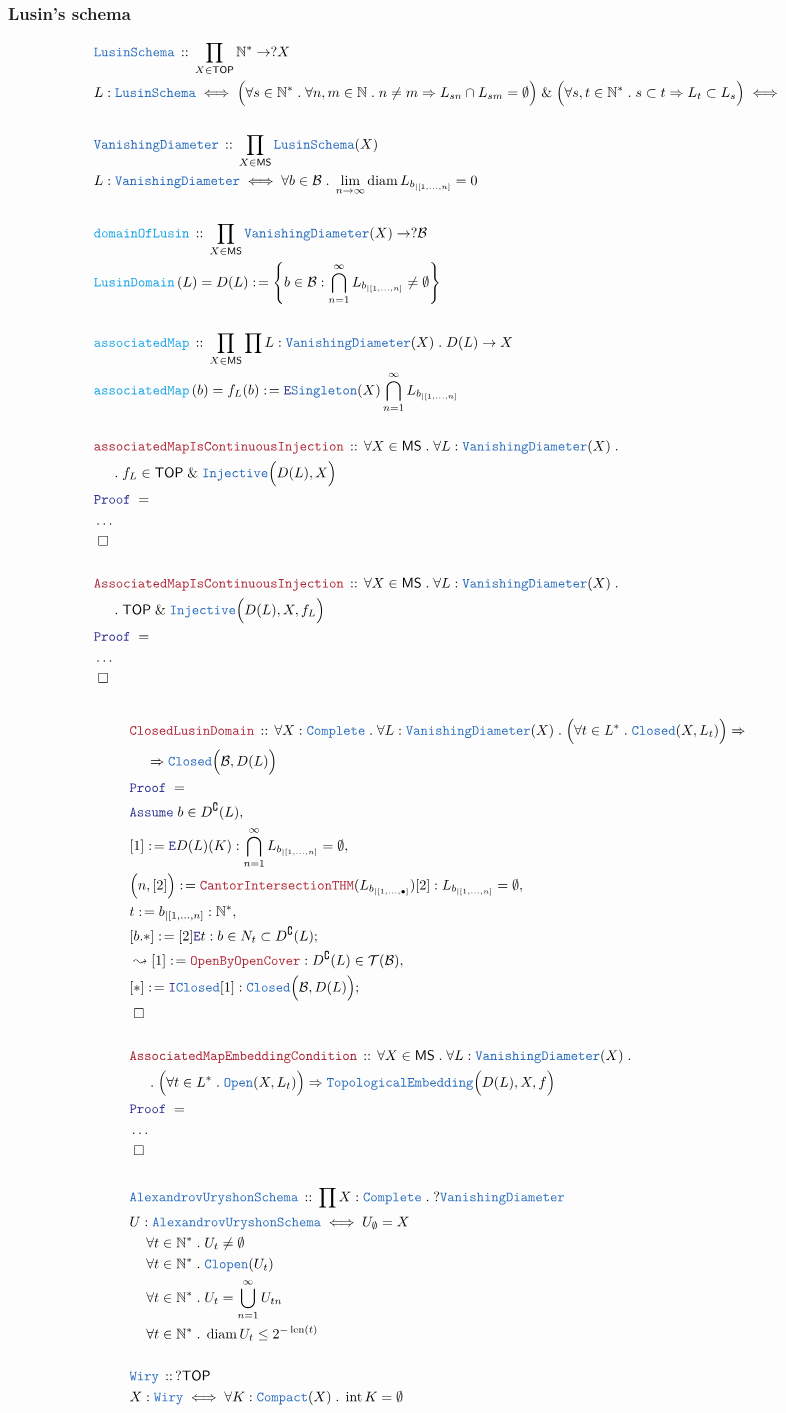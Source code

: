 \documentclass[12pt]{scrartcl}
\newcommand{\TYPE}[1]{\textcolor{NavyBlue}{\mathtt{#1}}}
\newcommand{\FUNC}[1]{\textcolor{Cerulean}{\mathtt{#1}}}
\newcommand{\LOGIC}[1]{\textcolor{Blue}{\mathtt{#1}}}
\newcommand{\THM}[1]{\textcolor{Maroon}{\mathtt{#1}}}
\renewcommand{\.}{\; . \;}
\newcommand{\de}{: \kern 0.1pc =}
\newcommand{\Act}[1]{\left( #1 \right)}
\newcommand{\Theorem}[2]{& \THM{#1} \, :: \, #2 \\ & \Proof = \\ }
\newcommand{\DeclareType}[2]{& \TYPE{#1} \, :: \, #2 \\}
\newcommand{\DefineType}[3]{& #1 : \TYPE{#2} \iff #3 \\}
\newcommand{\DefineNamedType}[4]{& #1 : \TYPE{#2} \iff #3 \iff #4 \\}
\newcommand{\DeclareFunc}[2]{& \FUNC{#1} \, :: \, #2 \\}
\newcommand{\DefineNamedFunc}[4]{&  \FUNC{#1}\Act{#2} = #3 \de #4 \\}
\newcommand{\NewLine}{\\ & \kern 1pc}
\newcommand{\Page}[1]{ \begin{align*} #1 \end{align*}   }
\newcommand{\NoProof}{ & \ldots \\ \EndProof}
\renewcommand{\And}{\; \& \;}
\newcommand{\Imply}{\Rightarrow}
\newcommand{\Intro}{\LOGIC{I}}
\newcommand{\Elim}{\LOGIC{E}}
\newcommand{\Nat}{\mathbb{N} }
\renewcommand{\c}{\complement}
\newcommand{\Say}[3]{& #1 \de #2 : #3, \\}
\newcommand{\Conclude}[3]{& #1 \de #2 : #3; \\}
\newcommand{\Derive}[3]{& \leadsto #1 \de #2 : #3, \\}
\newcommand{\AssumeIn}[2]{& \LOGIC{Assume} \; #1 \in #2, \\}
\newcommand{\QED}{\; \square}
\newcommand{\EndProof}{& \QED \\}
\newcommand{\Proof}{\LOGIC{Proof} \; }
\newcommand{\B}{\mathcal{B}}
\newcommand{\Compact}{\TYPE{Compact}}
\newcommand{\Clopen}{\TYPE{Clopen}}
\DeclareMathOperator*{\intx}{int}
\newcommand{\TOP}{\mathsf{TOP}}
\newcommand{\T}{\mathcal{T}}
\DeclareMathOperator{\diam}{diam}
\newcommand{\MS}{\mathsf{MS}}
\newcommand{\FS}[1]{{#1}{}^*}
\DeclareMathOperator{\len}{len}
\newcommand{\inits}[2]{{#1}_{|\left[1,\ldots,#2\right]}}
\begin{document}
\subsubsection{Lusin's schema}
\Page{
	\DeclareType{LusinSchema}
	{
		\prod_{X \in \TOP}  \FS{\Nat} \to ?X
	}
	\DefineNamedType{L}{LusinSchema}{
		\Big(
			\forall s \in \FS{\Nat} \. \forall n,m \in \Nat \. 
			n \neq m \Imply L_{sn} \cap L_{sm} = \emptyset
		\Big)
		\And
		\Big(
			\forall s,t \in \FS{\Nat} \.
			s \subset t 
			\Imply
			L_t \subset L_s
		\Big)
	}
	\\
	\DeclareType{VanishingDiameter}{\prod_{X \in \MS} \TYPE{LusinSchema}(X) }
	\DefineType{L}{VanishingDiameter}{\forall b \in \B \. \lim_{n \to \infty} \diam L_{\inits{b}{n}} = 0}
	\\
	\DeclareFunc{domainOfLusin}{\prod_{X \in \MS} \TYPE{VanishingDiameter}(X) \to ?\B }
	\DefineNamedFunc{LusinDomain}{L}{D(L)}{\left\{ b \in \B : \bigcap_{n=1}^\infty L_{\inits{b}{n}} \neq \emptyset  \right\}}
	\\
	\DeclareFunc{associatedMap}{\prod_{X \in \MS} \prod L : \TYPE{VanishingDiameter}(X)  \. D(L) \to X }
	\DefineNamedFunc{associatedMap}{b}{f_L(b)}{\Elim \TYPE{Singleton}(X)\bigcap^\infty_{n=1} L_{\inits{b}{n}} }
	\\
	\Theorem{associatedMapIsContinuousInjection}
	{
		\forall X \in \MS \. 
		\forall L : \TYPE{VanishingDiameter}(X) \. \NewLine \.
		f_L \in \TOP \And \TYPE{Injective}\Big( D(L),X \Big)
	}
	\NoProof
	\\
	\Theorem{AssociatedMapIsContinuousInjection}
	{
		\forall X \in \MS \. 
		\forall L : \TYPE{VanishingDiameter}(X) \. \NewLine \.
		\TOP \And \TYPE{Injective}\Big( D(L),X, f_L \Big)
	}
	\NoProof
	\\
}\Page{
	\Theorem{ClosedLusinDomain}
	{
		\forall X : \TYPE{Complete} \. 
		\forall L : \TYPE{VanishingDiameter}(X) \.
		\Big( \forall t \in \FS{L} \. \TYPE{Closed}(X,L_t) \Big)
		\Imply \NewLine \Imply
		\TYPE{Closed}\Big(\B,D(L)\Big)
	}
	\AssumeIn{b}{D^\c(L)}
	\Say{[1]}{\Elim D(L)(K)}{\bigcap^\infty_{n=1} L_{\inits{b}{n}} = \emptyset}
	\Say{\Big(n,[2]\Big)}{\THM{CantorIntersectionTHM}(L_{\inits{b}{\bullet}})[2]}
	{
		L_{\inits{b}{n}} = \emptyset
	}
	\Say{t}{\inits{b}{n}}{\FS{\Nat}}
	\Conclude{[b.*]}{[2]\Elim t}{b \in N_t \subset D^\c(L)}
	\Derive{[1]}{\THM{OpenByOpenCover}}{D^\c(L) \in \T(\B)}
	\Conclude{[*]}{\Intro \TYPE{Closed}[1]}{\TYPE{Closed}\Big( \B, D(L) \Big)}
	\EndProof
	\\
	\Theorem{AssociatedMapEmbeddingCondition}
	{
		\forall X \in \MS \. 
		\forall L : \TYPE{VanishingDiameter}(X) \.\NewLine \.
		\Big( \forall t \in \FS{L} \. \TYPE{Open}(X,L_t) \Big)
		\Imply 
		\TYPE{TopologicalEmbedding}\Big( D(L),X, f \Big)
	}
	\NoProof
	\\
	\DeclareType{AlexandrovUryshonSchema}{\prod X : \TYPE{Complete} \. ?\TYPE{VanishingDiameter}}
	\DefineType{U}{AlexandrovUryshonSchema}
	{
		U_\emptyset = X \NewLine 
		\forall t \in \FS{\Nat} \. U_t \neq \emptyset \NewLine
		\forall t \in \FS{\Nat} \. \Clopen(U_t) \NewLine 
		\forall t \in \FS{\Nat} \. U_t = \bigcup_{n=1}^\infty U_{tn} \NewLine
		\forall t \in \FS{\Nat} \. \diam U_t \le 2^{-\len(t)}
	}
	\\
	\DeclareType{Wiry}{?\TOP}
	\DefineType{X}{Wiry}{\forall K : \Compact(X) \. \intx K = \emptyset}
}
\end{document}
